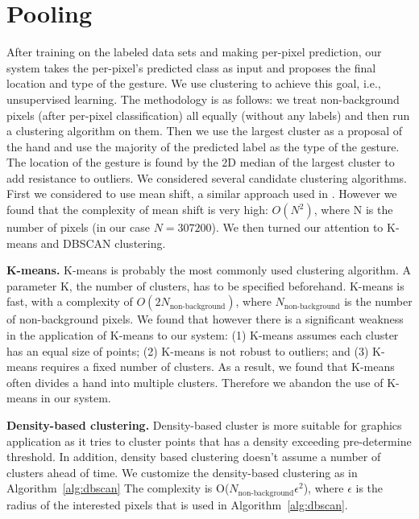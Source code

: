 \section{Pooling}
\label{sec: pooling}

After training on the labeled data sets and making per-pixel prediction, our system takes the per-pixel's predicted class as input and proposes the final location and type of the gesture. We use clustering to achieve this goal, i.e., unsupervised learning. The methodology is as follows: we treat non-background pixels (after per-pixel classification) all equally (without any labels) and then run a clustering algorithm on them. Then we use the largest cluster as a proposal of the hand and use the majority of the predicted label as the type of the gesture. The location of the gesture is found by the 2D median of the largest cluster to add resistance to outliers. We considered several candidate clustering algorithms. First we considered to use mean shift, a similar approach used in \cite{shotton2011}. However we found that the complexity of mean shift is very high: $O(N^2)$, where N is the number of pixels (in our case $N= 307200$). We then turned our attention to K-means and DBSCAN clustering.

\textbf{K-means.} K-means is probably the most commonly used clustering algorithm. A parameter K, the number of clusters, has to be specified beforehand. K-means is fast, with a complexity of $O(2N_{\text{non-background}})$, where $N_{\text{non-background}}$ is the number of non-background pixels. We found that however there is a significant weakness in the application of K-means to our system: (1) K-means assumes each cluster has an equal size of points; (2) K-means is not robust to outliers; and (3) K-means requires a fixed number of clusters. As a result, we found that K-means often divides a hand into multiple clusters. Therefore we abandon the use of K-means in our system.

\textbf{Density-based clustering.} Density-based cluster is more suitable for graphics application as it tries to cluster points that has a density exceeding pre-determine threshold. In addition, density based clustering doesn't assume a number of clusters ahead of time. We customize the density-based clustering as in Algorithm~\ref{alg:dbscan} The complexity is O($N_{\text{non-background} }\epsilon^2$), where $\epsilon$ is the radius of the interested pixels that is used in Algorithm~\ref{alg:dbscan}.

